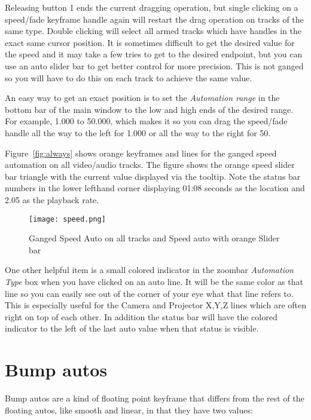 Releasing button 1 ends the current dragging operation, but single clicking on a speed/fade keyframe handle again will restart the drag operation on tracks of the same type.  Double clicking will select all armed tracks which have handles in the exact same cursor position.  It is sometimes difficult to get the desired value for the speed and it may take a few tries to get to the desired endpoint, but you can use an auto slider bar to get better control for more precision.  This is not ganged so you will have to do this on each track to achieve the same value.

An easy way to get an exact position is to set the \textit{Automation range} in the bottom bar of the main
window to the low and high ends of the desired range. For example, 1.000 to 50.000, which makes it
so you can drag the speed/fade handle all the way to the left for 1.000 or all the way to the right for 50.

Figure~\ref{fig:always} shows orange keyframes and lines for the ganged speed automation on all video/audio tracks. The figure shows the orange speed slider bar triangle with the current value displayed via the tooltip. Note the status bar numbers in the lower lefthand corner displaying 01:08 seconds as the location and 2.05 as the playback rate.

\begin{figure}[htpb]
    \centering
    \texttt{[image: speed.png]}
    \caption{Ganged Speed Auto on all tracks and Speed auto with orange Slider bar}
    \label{fig:speed}
\end{figure}

One other helpful item is a small colored indicator in the zoombar \textit{Automation Type} box when you have clicked on an auto line.  It will be the same color as that line so you can easily see out of the corner of your eye what that line refers to.  This is especially useful for the Camera and Projector X,Y,Z lines which are often right on top of each other.  In addition the status bar will have the colored indicator to the left of the last auto value when that status is visible.

\section{Bump autos}%
\label{sec:bump_autos}

Bump autos are a kind of floating point keyframe that differs from the rest
of the floating autos, like smooth and linear, in that they have two values:

